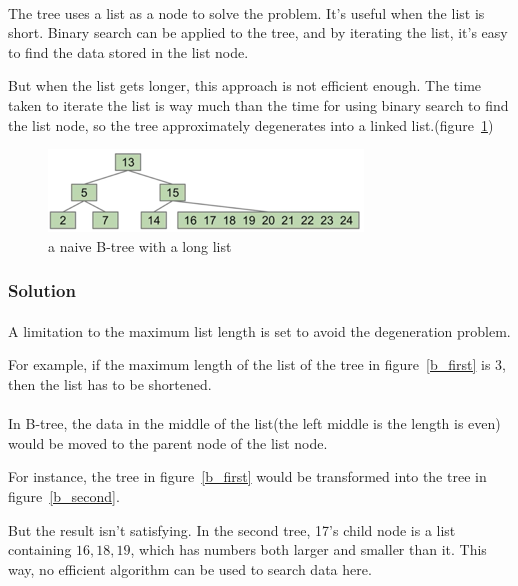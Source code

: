 \documentclass{article}
\begin{document}
\paragraph{}
The tree uses a list as a node to solve the problem. It's useful when the list is short. Binary search can be applied to the tree, and by iterating the list, it's easy to find the data stored in the list node.

But when the list gets longer, this approach is not efficient enough. The time taken to iterate the list is way much than the time for using binary search to find the list node, so the tree approximately degenerates into a linked list.(figure~\ref{naive_b_problem})

\begin{figure}[htbp]
    \centering
	\includegraphics[width = \textwidth]{naive_b_problem.png}
	\caption{a naive B-tree with a long list}
	\label{naive_b_problem}
\end{figure}

\subsubsection{Solution}

\paragraph{}
A limitation to the maximum list length is set to avoid the degeneration problem.

For example, if the maximum length of the list of the tree in figure~\ref{b_first} is 3, then the list has to be shortened. 

\paragraph{}
In B-tree, the data in the middle of the list(the left middle is the length is even) would be moved to the parent node of the list node.

For instance, the tree in figure~\ref{b_first} would be transformed into the tree in figure~\ref{b_second}.

But the result isn't satisfying. In the second tree, 17's child node is a list containing $16,18,19$, which has numbers both larger and smaller than it. This way, no efficient algorithm can be used to search data here.
\end{document}
